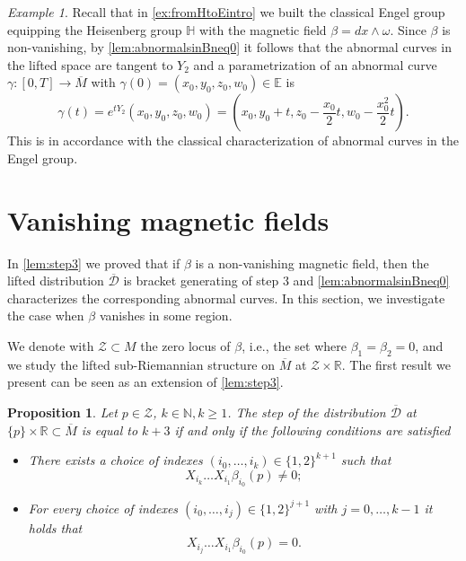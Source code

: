 \documentclass{amsart}
\theoremstyle{plain}
\newtheorem{proposition}[theorem]{Proposition}
\theoremstyle{definition}
\theoremstyle{remark}
\newtheorem{example}[thm]{Example}
\newcommand{\R}{\mathbb{R}}
\newcommand{\sr}{sub-{R}ie\-man\-nian }
\newcommand{\distr}{\mathcal{D}}								%
\newcommand{\B}{\beta}
\newcommand{\lift}[1]{\overline{#1}} 							%
\begin{document}
\begin{example}
Recall that in \cref{ex:fromHtoEintro} we built the classical Engel group equipping the Heisenberg group $\mathbb{H}$ with the magnetic field $\B=dx\wedge\omega$.
Since $\B$ is non-vanishing, by \cref{lem:abnormalsinBneq0} it follows that the abnormal curves in the lifted space are tangent to $Y_2$ and a parametrization of an abnormal curve $\gamma:[0,T]\to\lift M$ with $\gamma(0)=(x_0,y_0,z_0,w_0)\in\mathbb{E}$ is 
\begin{equation}
 \gamma(t)=e^{tY_2}(x_0,y_0,z_0,w_0)=\left(x_0,y_0+t,z_0-\frac{x_0}2t,w_0-\frac{x_0^2}{2}t\right).
\end{equation}
This is in accordance with the classical characterization of abnormal curves in the Engel group. 
\end{example}




\section{Vanishing magnetic fields}
\label{s:zeromf}
In \cref{lem:step3} we proved that if $\B$ is a non-vanishing magnetic field, then the lifted distribution $\lift\distr$ is bracket generating of step 3 and \cref{lem:abnormalsinBneq0} characterizes the corresponding abnormal curves. 
 In this section, we investigate the case when $\B$ vanishes in some region.
 
We denote with $\mathcal{Z}\subset M$ the zero locus of $\B$, i.e., the set where $\beta_{1}=\beta_{2}=0$, and we study the lifted \sr structure on $\lift M$ at $\mathcal{Z}\times \R$.
The first result we present can be seen as an extension of  \cref{lem:step3}.

\begin{proposition}
\label{lem:step}
Let $p\in \mathcal{Z}$, $k\in \mathbb{N}, k\geq 1$.
The step of the distribution $\lift\distr$ at $\{p\}\times \R \subset \lift M$ is equal to $k+3$ if and only if the following conditions are satisfied
\begin{itemize}
\item[(a)] There exists a choice of indexes $(i_0,\ldots,i_k)\in\{1,2\}^{k+1}$ such that 
\begin{equation}
X_{i_k}\ldots X_{i_{1}}\B_{i_0}(p)\neq 0;
\end{equation}
\item[(b)] For every choice of indexes $(i_0,\ldots,i_{j})\in\{1,2\}^{j+1}$ with $j=0,\ldots,k-1$ it holds that 
\begin{equation}
X_{i_{j}}\ldots X_{i_{1}}\B_{i_{0}}(p)= 0.
\end{equation}
\end{itemize}
\end{proposition}
\end{document}
